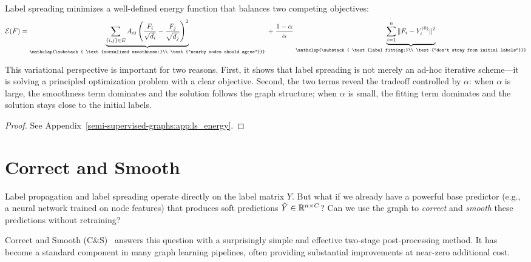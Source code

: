 \begin{notechapter}
\begin{theorem}
\label{semi-supervised-graphs:thm:ls_energy}
Label spreading minimizes a well-defined energy function that balances two
competing objectives:
\begin{equation}
\mathcal{E}(F) = 
\underbrace{\sum_{\{i,j\}\in E} A_{ij}\left(\frac{F_i}{\sqrt{d_i}} -
\frac{F_j}{\sqrt{d_j}}\right)^2}_{\mathclap{\substack{
    \text{normalized smoothness:}\\ 
    \text{``nearby nodes should agree''}}}} \; + \; \frac{1-\alpha}{\alpha}\,
\underbrace{\sum_{i=1}^n \|F_i - Y_i^{(0)}\|^2}_{\mathclap{\substack{
    \text{label fitting:}\\
    \text{``don't stray from initial labels''}}}}
\end{equation}
\end{theorem}

This variational perspective is important for two reasons. First, it shows
that label spreading is not merely an ad-hoc iterative scheme---it is solving
a principled optimization problem with a clear objective. Second, the two
terms reveal the tradeoff controlled by $\alpha$: when $\alpha$ is large, the
smoothness term dominates and the solution follows the graph structure; when
$\alpha$ is small, the fitting term dominates and the solution stays close to
the initial labels.

\begin{proof}
See Appendix~\ref{semi-supervised-graphs:app:ls_energy}.
\end{proof}

\section{Correct and Smooth}
\label{semi-supervised-graphs:sec:cs}

Label propagation and label spreading operate directly on the label matrix
$Y$. But what if we already have a powerful base predictor (e.g., a neural
network trained on node features) that produces soft predictions
$\hat{Y} \in \mathbb{R}^{n \times C}$? Can we use the graph to \emph{correct} and
\emph{smooth} these predictions without retraining?

Correct and Smooth (C\&S)~\cite{semi-supervised-graphs:huang2021} answers this question with a
surprisingly simple and effective two-stage post-processing method. It has
become a standard component in many graph learning pipelines, often providing
substantial improvements at near-zero additional cost.


\end{notechapter}
